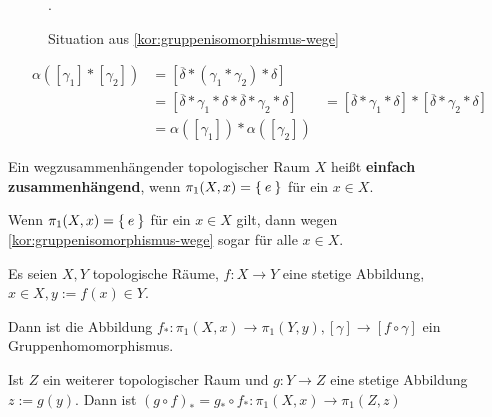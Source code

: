\begin{figure}[htp]
    \centering
    
    \caption{Situation aus \cref{kor:gruppenisomorphismus-wege}}.
    \label{fig:situation-gruppenisomorphismus-wege}
\end{figure}

\begin{beweis}
    \begin{align*}
        \alpha([\gamma_1] * [\gamma_2]) &= [\overline{\delta} * (\gamma_1 * \gamma_2) * \delta]\\
        &= [\overline{\delta} * \gamma_1 * \delta * \overline{\delta} * \gamma_2 * \delta]
        &= [\overline{\delta} * \gamma_1 * \delta] * [\overline{\delta} * \gamma_2 * \delta]\\
        &= \alpha([\gamma_1]) * \alpha([\gamma_2])
    \end{align*}
\end{beweis}

\begin{definition}%
    Ein wegzusammenhängender topologischer Raum $X$ heißt
    \textbf{einfach zusammenhängend}, wenn $\pi_1(X,x) = \Set{e}$
    für ein $x \in X$.
\end{definition}

Wenn $\pi_1(X,x) = \Set{e}$ für ein $x \in X$ gilt, dann wegen 
\cref{kor:gruppenisomorphismus-wege} sogar für alle $x \in X$.

\begin{bemerkung}\label{korr:11.5}
    Es seien $X, Y$ topologische Räume, $f:X \rightarrow Y$ eine
    stetige Abbildung, $x \in X, y := f(x) \in Y$.

    \begin{bemenum}
        \item Dann ist die Abbildung $f_* : \pi_1(X,x) \rightarrow \pi_1(Y, y),
        [\gamma] \rightarrow [f \circ \gamma]$ ein Gruppenhomomorphismus.
        \item Ist $Z$ ein weiterer topologischer Raum und $g: Y \rightarrow Z$
              eine stetige Abbildung $z:= g(y)$. Dann ist
              $(g \circ f)_* = g_* \circ f_*: \pi_1(X,x) \rightarrow \pi_1(Z,z)$
    \end{bemenum}
\end{bemerkung}


